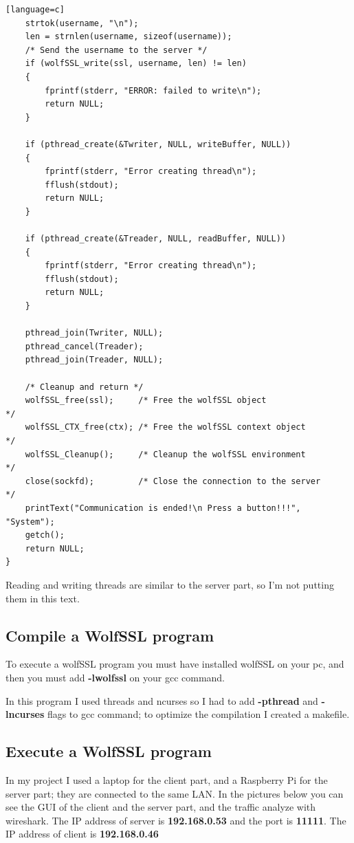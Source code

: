\documentclass[a4paper,12pt]{article}
\begin{document}
\begin{lstlisting}[caption={void *client(void *args) of SSL client},captionpos=b][language=c]
    strtok(username, "\n");
    len = strnlen(username, sizeof(username));
    /* Send the username to the server */
    if (wolfSSL_write(ssl, username, len) != len)
    {
        fprintf(stderr, "ERROR: failed to write\n");
        return NULL;
    }

    if (pthread_create(&Twriter, NULL, writeBuffer, NULL))
    {
        fprintf(stderr, "Error creating thread\n");
        fflush(stdout);
        return NULL;
    }

    if (pthread_create(&Treader, NULL, readBuffer, NULL))
    {
        fprintf(stderr, "Error creating thread\n");
        fflush(stdout);
        return NULL;
    }

    pthread_join(Twriter, NULL);
    pthread_cancel(Treader);
    pthread_join(Treader, NULL);

    /* Cleanup and return */
    wolfSSL_free(ssl);     /* Free the wolfSSL object                  */
    wolfSSL_CTX_free(ctx); /* Free the wolfSSL context object          */
    wolfSSL_Cleanup();     /* Cleanup the wolfSSL environment          */
    close(sockfd);         /* Close the connection to the server       */
    printText("Communication is ended!\n Press a button!!!", "System");
    getch();
    return NULL;
}
\end{lstlisting}

Reading and writing threads are similar to the server part, so I'm not putting them in this text.

\subsection{Compile a WolfSSL program}
To execute a wolfSSL program you must have installed wolfSSL on your pc, and then you must add \textbf{-lwolfssl} on your gcc command.

In this program I used threads and ncurses so I had to add \textbf{-pthread} and \textbf{-lncurses} flags to gcc command; to optimize the compilation I created a makefile.

\subsection{Execute a WolfSSL program}
In my project I used a laptop for the client part, and a Raspberry Pi for the server part; they are connected to the same LAN.
In the pictures below you can see the GUI of the client and the server part, and the traffic analyze with wireshark.
The IP address of server is \textbf{192.168.0.53} and the port is \textbf{11111}.
The IP address of client is \textbf{192.168.0.46}\\
\end{document}
